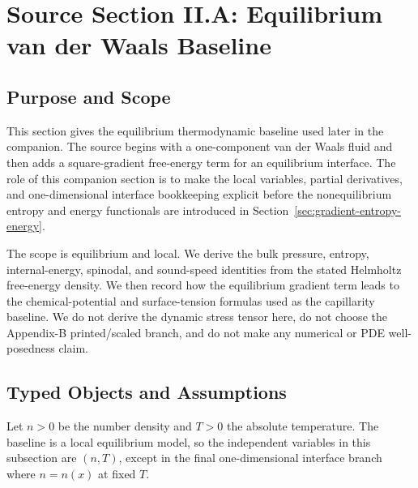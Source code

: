 \section{Source Section II.A: Equilibrium van der Waals Baseline}
\label{sec:vdw-baseline}


\subsection{Purpose and Scope}

This section gives the equilibrium thermodynamic baseline used later in the
companion.  The source begins with a one-component van der Waals fluid and then
adds a square-gradient free-energy term for an equilibrium interface.  The role
of this companion section is to make the local variables, partial derivatives,
and one-dimensional interface bookkeeping explicit before the nonequilibrium
entropy and energy functionals are introduced in Section~\ref{sec:gradient-entropy-energy}.

The scope is equilibrium and local.  We derive the bulk pressure, entropy,
internal-energy, spinodal, and sound-speed identities from the stated Helmholtz
free-energy density.  We then record how the equilibrium gradient term leads to
the chemical-potential and surface-tension formulas used as the capillarity
baseline.  We do not derive the dynamic stress tensor here, do not choose the
Appendix-B printed/scaled branch, and do not make any numerical or PDE
well-posedness claim.

\subsection{Typed Objects and Assumptions}

Let \(n>0\) be the number density and \(T>0\) the absolute temperature.  The
baseline is a local equilibrium model, so the independent variables in this
subsection are \((n,T)\), except in the final one-dimensional interface branch
where \(n=n(x)\) at fixed \(T\).

